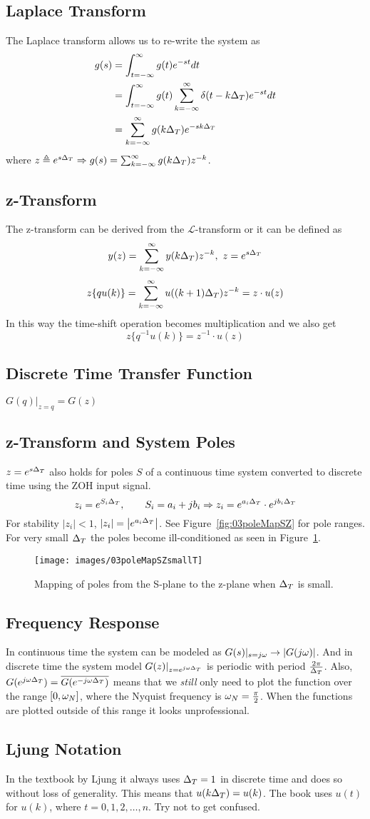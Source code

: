 \subsection{Laplace Transform}
The Laplace transform allows us to re-write the system as
\begin{align*}
g(s) &= \int_{t=-\infty}^\infty g(t)e^{-st}dt \\
&= \int_{t=-\infty}^\infty g(t)\sum_{k=-\infty}^\infty \delta(t-k\Delta_T)e^{-st}dt \\
&= \sum_{k=-\infty}^\infty g(k\Delta_T)e^{-sk\Delta_T}
\end{align*}
where $z\triangleq e^{s\Delta_T} \Rightarrow g(s) = \sum_{k=-\infty}^\infty g(k\Delta_T)z^{-k}$.

\subsection{z-Transform}
The z-transform can be derived from the $\mathcal{L}$-transform or it can be defined as
$$y(z) = \sum_{k=-\infty}^\infty y(k\Delta_T)z^{-k},~z=e^{s\Delta_T}$$
$$z\lbrace qu(k)\rbrace = \sum_{k=-\infty}^\infty u((k+1)\Delta_T)z^{-k} = z\cdot u(z)$$
In this way the time-shift operation becomes multiplication and we also get
$$z\lbrace q^{-1}u(k)\rbrace = z^{-1}\cdot u(z)$$

\subsection{Discrete Time Transfer Function}
$G(q)|_{z=q} = G(z)$

\subsection{z-Transform and System Poles}
$z=e^{s\Delta_T}$ also holds for poles $S$ of a continuous time system converted to discrete time using the ZOH input signal.
$$z_i=e^{S_i\Delta_T}, \qquad S_i = a_i+jb_i \Rightarrow z_i = e^{a_i\Delta_T} \cdot e^{jb_i\Delta_T}$$
For stability $|z_i|<1$, $|z_i|=\left| e^{a_i\Delta_T}\right|$.
See Figure~\ref{fig:03poleMapSZ} for pole ranges.
For very small $\Delta_T$ the poles become ill-conditioned as seen in Figure~\ref{fig:03poleMapSZsmallT}.
\begin{figure}[ht!]
\centering
\texttt{[image: images/03poleMapSZsmallT]}
\caption{Mapping of poles from the S-plane to the z-plane when $\Delta_T$ is small.}
\label{fig:03poleMapSZsmallT}
\end{figure}

\subsection{Frequency Response}
In continuous time the system can be modeled as $G(s)|_{s=j\omega}\to|G(j\omega)|$.
And in discrete time the system model $G(z)|_{z=e^{j\omega\Delta_T}}$ is periodic with period $\frac{2\pi}{\Delta_T}$.
Also, $G(e^{j\omega\Delta_T}) = \overline{G(e^{-j\omega\Delta_T})}$ means that we  \textit{still} only need to plot the function over the range $[0, \omega_N]$, where the Nyquist frequency is $\omega_N=\frac{\pi}{2}$.
When the functions are plotted outside of this range it looks unprofessional.

\subsection{Ljung Notation}
In the textbook by Ljung it always uses $\Delta_T=1$ in discrete time and does so without loss of generality.
This means that $u(k\Delta_T) = u(k)$.
The book uses $u(t)$ for $u(k)$, where $t=0,1,2,\ldots,n$.
Try not to get confused.
